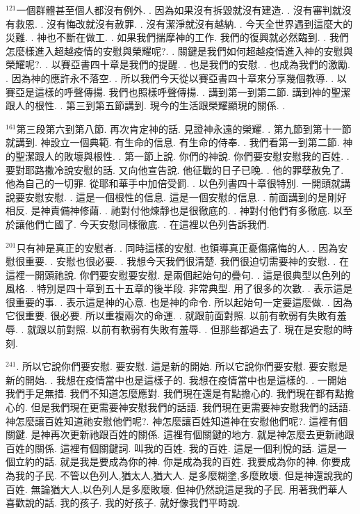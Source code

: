 \documentclass{book}
\begin{document}
$^{121}$一個群體甚至個人都沒有例外.
.
因為如果沒有拆毀就沒有建造.
.
沒有審判就沒有救恩.
.
沒有悔改就沒有赦罪.
.
沒有潔淨就沒有越納.
.
今天全世界遇到這麼大的災難.
.
神也不斷在做工.
.
如果我們揣摩神的工作.
我們的復興就必然臨到.
.
我們怎麼樣進入超越疫情的安慰與榮耀呢?.
.
關鍵是我們如何超越疫情進入神的安慰與榮耀呢?.
.
以賽亞書四十章是我們的提醒.
.
也是我們的安慰.
.
也成為我們的激勵.
.
因為神的應許永不落空.
.
所以我們今天從以賽亞書四十章來分享幾個教導.
.
以賽亞是這樣的呼聲傳揚.
我們也照樣呼聲傳揚.
.
講到第一到第二節.
講到神的聖潔跟人的根性.
.
第三到第五節講到.
現今的生活跟榮耀顯現的關係.
.

$^{161}$第三段第六到第八節.
再次肯定神的話.
見證神永遠的榮耀.
.
第九節到第十一節就講到.
神設立一個典範.
有生命的信息.
有生命的侍奉.
.
我們看第一到第二節.
神的聖潔跟人的敗壞與根性.
.
第一節上說.
你們的神說.
你們要安慰安慰我的百姓.
.
要對耶路撒冷說安慰的話.
又向他宣告說.
他征戰的日子已晚.
.
他的罪孽赦免了.
他為自己的一切罪.
從耶和華手中加倍受罰.
.
以色列書四十章很特別.
一開頭就講說要安慰安慰.
.
這是一個根性的信息.
這是一個安慰的信息.
.
前面講到的是剛好相反.
是神責備神修繭.
.
祂對付他煉靜也是很徹底的.
.
神對付他們有多徹底.
以至於讓他們亡國了.
今天安慰同樣徹底.
.
在這裡以色列告訴我們.

$^{201}$只有神是真正的安慰者.
.
同時這樣的安慰.
也領導真正憂傷痛悔的人.
.
因為安慰很重要.
.
安慰也很必要.
.
我想今天我們很清楚.
我們很迫切需要神的安慰.
.
在這裡一開頭祂說.
你們要安慰要安慰.
是兩個起始句的疊句.
.
這是很典型以色列的風格.
.
特別是四十章到五十五章的後半段.
非常典型.
用了很多的次數.
.
表示這是很重要的事.
.
表示這是神的心意.
也是神的命令.
所以起始句一定要這麼做.
.
因為它很重要.
很必要.
所以重複兩次的命運.
.
就跟前面對照.
以前有軟弱有失敗有羞辱.
.
就跟以前對照.
以前有軟弱有失敗有羞辱.
.
但那些都過去了.
現在是安慰的時刻.

$^{241}$.
所以它說你們要安慰.
要安慰.
這是新的開始.
所以它說你們要安慰.
要安慰是新的開始.
.
我想在疫情當中也是這樣子的.
我想在疫情當中也是這樣的.
.
一開始我們手足無措.
我們不知道怎麼應對.
我們現在還是有點擔心的.
我們現在都有點擔心的.
但是我們現在更需要神安慰我們的話語.
我們現在更需要神安慰我們的話語.
神怎麼讓百姓知道祂安慰他們呢?.
神怎麼讓百姓知道神在安慰他們呢?.
這裡有個關鍵.
是神再次更新祂跟百姓的關係.
這裡有個關鍵的地方.
就是神怎麼去更新祂跟百姓的關係.
這裡有個關鍵詞.
叫我的百姓.
我的百姓.
這是一個利悅的話.
這是一個立約的話.
就是我是要成為你的神.
你是成為我的百姓.
我要成為你的神.
你要成為我的子民.
不管以色列人,猶太人,猶大人.
是多麼糊塗,多麼敗壞.
但是神還說我的百姓.
無論猶大人,以色列人是多麼敗壞.
但神仍然說這是我的子民.
用著我們華人喜歡說的話.
我的孩子.
我的好孩子.
就好像我們平時說.
\end{document}
